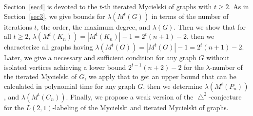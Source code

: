 \documentclass{article}
\newtheorem{open problem} {Open Problem}
\numberwithin{lemma}{section}
\numberwithin{theorem}{section}
\numberwithin{cor}{section}
\numberwithin{prop}{section}
\numberwithin{con}{section}
\numberwithin{claim}{section}
\numberwithin{obs}{section}
\numberwithin{dnt}{section}
\begin{document}
\par Section~\ref{sec4} is devoted to the $t$-th iterated Mycielski of graphs with $t\geq 2$. As in Section~\ref{sec3}, we give bounds for $\lambda(M^t(G))$ in terms of the number of iterations $t$, the order,  the maximum degree, and $\lambda(G)$. Then we show that for all $t\geq 2$, $\lambda(M^t(K_n))=|M^t(K_n)|-1=2^t(n+1)-2$, then we characterize all graphs having $\lambda(M^t(G))=|M^t(G)|-1=2^t(n+1)-2$. Later, we give a necessary and sufficient condition for any graph $G$ without isolated vertices achieving a lower bound $2^{t-1}(n+2)-2$ for the $\lambda$-number of the iterated Mycielski of $G$, we apply that to get an upper bound that can be calculated in polynomial time for any graph $G$, then we determine $\lambda(M^t(P_n))$, and $\lambda(M^t(C_n))$. Finally, we propose a weak version of the $\bigtriangleup^2$-conjecture for the $L(2,1)$-labeling of the Mycielski and iterated Mycielski of graphs. 
\end{document}
